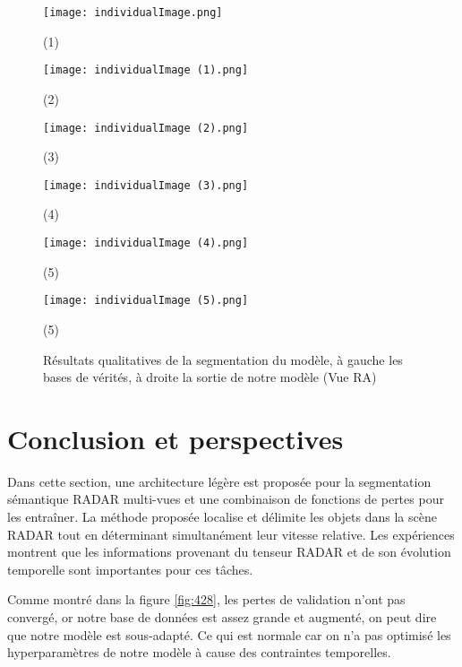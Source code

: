 \newpage
\begin{figure}[hbt!]
  \centering
  \begin{minipage}{0.45\linewidth}
    \centering
    \texttt{[image: individualImage.png]}
    \caption{(1)}
  \end{minipage}
  \begin{minipage}{0.45\linewidth}
    \texttt{[image: individualImage (1).png]}   
   \caption{(2)}
  \end{minipage}
  \hfill
  \begin{minipage}{0.45\linewidth}
    \centering
    \texttt{[image: individualImage (2).png]}
    \caption{(3)}
  \end{minipage}
  \begin{minipage}{0.45\linewidth}

    \texttt{[image: individualImage (3).png]}
    \caption{(4)}
  \end{minipage}
  \begin{minipage}{0.45\linewidth}
    \centering
    \texttt{[image: individualImage (4).png]}
    \caption{(5)}
  \end{minipage}
  \begin{minipage}{0.45\linewidth}
    \centering
    \texttt{[image: individualImage (5).png]}
    \caption{(5)}
  \end{minipage}
  \caption{Résultats qualitatives de la segmentation du modèle, à gauche les bases de vérités, à droite la sortie de notre modèle (Vue RA)}
  \label{fig:435}
\end{figure}

\section{Conclusion et perspectives }

Dans cette section, une architecture légère est proposée pour la segmentation sémantique RADAR multi-vues et une combinaison de fonctions de pertes pour les entraîner. La méthode proposée localise et délimite les objets dans la scène RADAR tout en déterminant simultanément leur vitesse relative. Les expériences montrent que les informations provenant du tenseur RADAR et de son évolution temporelle sont importantes pour ces tâches.

Comme montré dans la figure \ref{fig:428}, les pertes de validation n'ont pas convergé, or notre base de données est assez grande et augmenté, on peut dire que notre modèle est sous-adapté. Ce qui est normale car on n'a pas optimisé les hyperparamètres de notre modèle à cause des contraintes temporelles.

